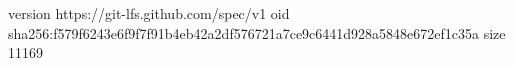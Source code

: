version https://git-lfs.github.com/spec/v1
oid sha256:f579f6243e6f9f7f91b4eb42a2df576721a7ce9c6441d928a5848e672ef1c35a
size 11169
